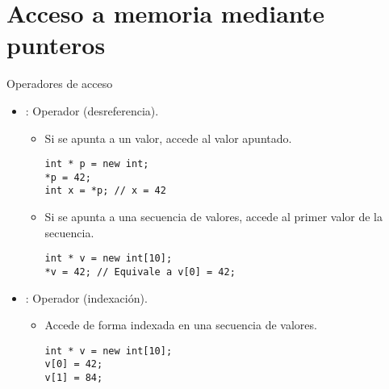 \section{Acceso a memoria mediante punteros}

\begin{frame}[t,fragile]{Operadores de acceso}
\begin{itemize}
  \item {}: Operador \cppkey{*} (desreferencia).
    \begin{itemize}
      \item Si se apunta a un valor, accede al valor apuntado.
\begin{lstlisting}
int * p = new int;
*p = 42;
int x = *p; // x = 42
\end{lstlisting}


      \item Si se apunta a una secuencia de valores, accede al primer valor de la secuencia.
\begin{lstlisting}
int * v = new int[10];
*v = 42; // Equivale a v[0] = 42;
\end{lstlisting}
    \end{itemize}

  \item {}: Operador \cppkey{[]} (indexación).
    \begin{itemize}
      \item Accede de forma indexada en una secuencia de valores.
\begin{lstlisting}
int * v = new int[10];
v[0] = 42;
v[1] = 84;
\end{lstlisting}
    \end{itemize}

\end{itemize}
\end{frame}

